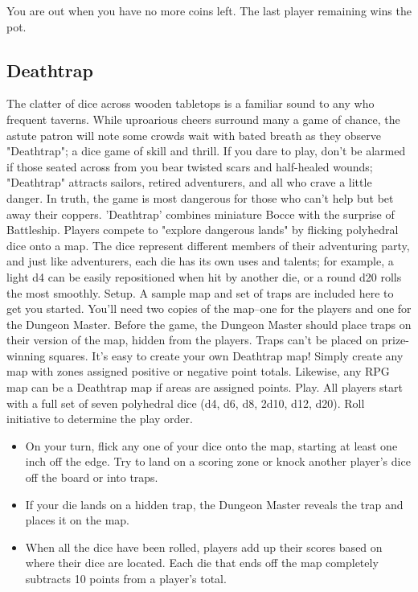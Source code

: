 \documentclass[10pt,a4paper,twoside,twocolumn,openany,bg=print,nodeprecatedcode]{dndbook}
\begin{document}
You are out when you have no more coins left. The last player remaining wins the pot.
\subsection{Deathtrap}
The clatter of dice across wooden tabletops is a familiar sound to any who frequent taverns. While uproarious cheers surround many a game of chance, the astute patron will note some crowds wait with bated breath as they observe "Deathtrap"; a dice game of skill and thrill. If you dare to play, don't be alarmed if those seated across from you bear twisted scars and half-healed wounds; "Deathtrap" attracts sailors, retired adventurers, and all who crave a little danger. In truth, the game is most dangerous for those who can't help but bet away their coppers.
'Deathtrap' combines miniature Bocce with the surprise of Battleship. Players compete to "explore dangerous lands" by flicking polyhedral dice onto a map. The dice represent different members of their adventuring party, and just like adventurers, each die has its own uses and talents; for example, a light d4 can be easily repositioned when hit by another die, or a round d20 rolls the most smoothly.
Setup. A sample map and set of traps are included here to get you started. You'll need two copies of the map–one for the players and one for the Dungeon Master. Before the game, the Dungeon Master should place traps on their version of the map, hidden from the players. Traps can't be placed on prize-winning squares.
It's easy to create your own Deathtrap map! Simply create any map with zones assigned positive or negative point totals. Likewise, any RPG map can be a Deathtrap map if areas are assigned points.
Play. All players start with a full set of seven polyhedral dice (d4, d6, d8, 2d10, d12, d20). Roll initiative to determine the play order.

\begin{itemize}
\item On your turn, flick any one of your dice onto the map, starting at least one inch off the edge. Try to land on a scoring zone or knock another player's dice off the board or into traps.
\item If your die lands on a hidden trap, the Dungeon Master reveals the trap and places it on the map.
\item When all the dice have been rolled, players add up their scores based on where their dice are located. Each die that ends off the map completely subtracts 10 points from a player's total.
\end{itemize}
\end{document}
